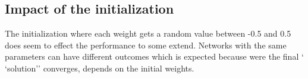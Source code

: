  \subsection{Impact of the initialization}
 The initialization where each weight gets a random value between -0.5 and 0.5 does seem to effect the performance to some extend. Networks with the same parameters can have different outcomes which is expected because were the final ` `solution'' converges, depends on the initial weights. 